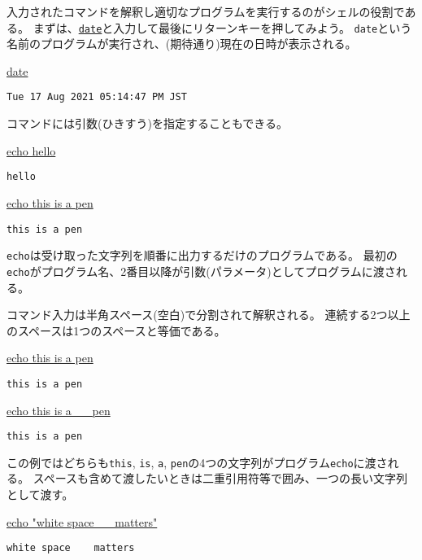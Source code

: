 入力されたコマンドを解釈し適切なプログラムを実行するのがシェルの役割である。
まずは、\texttt{\underline{date}}と入力して最後にリターンキーを押してみよう。
\texttt{date}という名前のプログラムが実行され、(期待通り)現在の日時が表示される。
\begin{commandline2}
    \prompt \underline{date}
    \vspace*{-.8em}
    \begin{verbatim}
Tue 17 Aug 2021 05:14:47 PM JST
\end{verbatim}
\end{commandline2} \noindent
コマンドには引数(ひきすう)を指定することもできる。
\begin{commandline2}
    \prompt \underline{echo hello}
    \vspace*{-.8em}
    \begin{verbatim}
hello
\end{verbatim}
    \vspace*{-.8em}
    \prompt \underline{echo this is a pen}
    \vspace*{-.8em}
    \begin{verbatim}
this is a pen
\end{verbatim}
\end{commandline2} \noindent
\texttt{echo}は受け取った文字列を順番に出力するだけのプログラムである。
最初の\texttt{echo}がプログラム名、2番目以降が引数(パラメータ)としてプログラムに渡される。

コマンド入力は半角スペース(空白)で分割されて解釈される。
連続する2つ以上のスペースは1つのスペースと等価である。
\begin{commandline2}
    \prompt \underline{echo this is a pen}
    \vspace*{-.8em}
    \begin{verbatim}
this is a pen
\end{verbatim}
    \vspace*{-.8em}
    \prompt \underline{echo this is a \ \ \ pen}
    \vspace*{-.8em}
    \begin{verbatim}
this is a pen
\end{verbatim}
\end{commandline2} \noindent
この例ではどちらも\texttt{this}, \texttt{is}, \texttt{a}, \texttt{pen}の4つの文字列がプログラム\texttt{echo}に渡される。
スペースも含めて渡したいときは二重引用符等で囲み、一つの長い文字列として渡す。
\begin{commandline2}
    \prompt \underline{echo "white space \ \ \ matters"}
    \vspace*{-.8em}
    \begin{verbatim}
white space    matters
\end{verbatim}
\end{commandline2}

